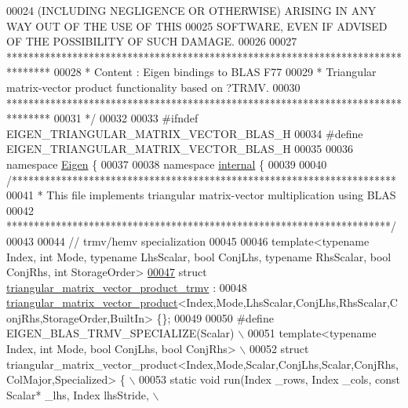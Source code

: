 \begin{DoxyCode}
00024 \textcolor{comment}{ (INCLUDING NEGLIGENCE OR OTHERWISE) ARISING IN ANY WAY OUT OF THE USE OF THIS}
00025 \textcolor{comment}{ SOFTWARE, EVEN IF ADVISED OF THE POSSIBILITY OF SUCH DAMAGE.}
00026 \textcolor{comment}{}
00027 \textcolor{comment}{ ********************************************************************************}
00028 \textcolor{comment}{ *   Content : Eigen bindings to BLAS F77}
00029 \textcolor{comment}{ *   Triangular matrix-vector product functionality based on ?TRMV.}
00030 \textcolor{comment}{ ********************************************************************************}
00031 \textcolor{comment}{*/}
00032 
00033 \textcolor{preprocessor}{#ifndef EIGEN\_TRIANGULAR\_MATRIX\_VECTOR\_BLAS\_H}
00034 \textcolor{preprocessor}{#define EIGEN\_TRIANGULAR\_MATRIX\_VECTOR\_BLAS\_H}
00035 
00036 \textcolor{keyword}{namespace }\hyperlink{namespace_eigen}{Eigen} \{ 
00037 
00038 \textcolor{keyword}{namespace }\hyperlink{namespaceinternal}{internal} \{
00039 
00040 \textcolor{comment}{/**********************************************************************}
00041 \textcolor{comment}{* This file implements triangular matrix-vector multiplication using BLAS}
00042 \textcolor{comment}{**********************************************************************/}
00043 
00044 \textcolor{comment}{// trmv/hemv specialization}
00045 
00046 \textcolor{keyword}{template}<\textcolor{keyword}{typename} Index, \textcolor{keywordtype}{int} Mode, \textcolor{keyword}{typename} LhsScalar, \textcolor{keywordtype}{bool} ConjLhs, \textcolor{keyword}{typename} RhsScalar, \textcolor{keywordtype}{bool} ConjRhs, \textcolor{keywordtype}{int} 
      StorageOrder>
\hyperlink{struct_eigen_1_1internal_1_1triangular__matrix__vector__product__trmv}{00047} \textcolor{keyword}{struct }\hyperlink{struct_eigen_1_1internal_1_1triangular__matrix__vector__product__trmv}{triangular\_matrix\_vector\_product\_trmv} :
00048   \hyperlink{struct_eigen_1_1internal_1_1triangular__matrix__vector__product}{triangular\_matrix\_vector\_product}<Index,Mode,LhsScalar,ConjLhs,RhsScalar,C
      onjRhs,StorageOrder,BuiltIn> \{\};
00049 
00050 \textcolor{preprocessor}{#define EIGEN\_BLAS\_TRMV\_SPECIALIZE(Scalar) \(\backslash\)}
00051 \textcolor{preprocessor}{template<typename Index, int Mode, bool ConjLhs, bool ConjRhs> \(\backslash\)}
00052 \textcolor{preprocessor}{struct triangular\_matrix\_vector\_product<Index,Mode,Scalar,ConjLhs,Scalar,ConjRhs,ColMajor,Specialized> \{ \(\backslash\)}
00053 \textcolor{preprocessor}{ static void run(Index \_rows, Index \_cols, const Scalar* \_lhs, Index lhsStride, \(\backslash\)}

\end{DoxyCode}
